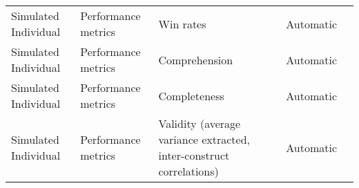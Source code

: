 \begin{small}
\begin{center}
\begin{longtable}{@{}p{}p{}p{}p{}p{}@{}}
Simulated Individual     & Performance metrics                 & Win rates                                                                                                                                                                                                   & Automatic & \cite{chi2024amongagentsevaluatinglargelanguage}                                                                                                                                                                                                                                                                                                                                                                                             \\
Simulated Individual     & Performance metrics                 & Comprehension                                                                                                                                                                                               & Automatic & \cite{10.1145/3643834.3660729}                                                                                                                                                                                                                                                                                                                                                                                \\
Simulated Individual     & Performance metrics                 & Completeness                                                                                                                                                                                                & Automatic & \cite{10.1145/3643834.3660729}                                                                                                                                                                                                                                                                                                                                                                                \\
Simulated Individual     & Performance metrics                 & Validity (average variance extracted, inter-construct correlations)                                                                                                                                         & Automatic & \cite{Ke2024HumanAISI}                                                                                                                                                                                                                                                                                                                                                                                           \\

\end{longtable}
\end{center}
\end{small}
